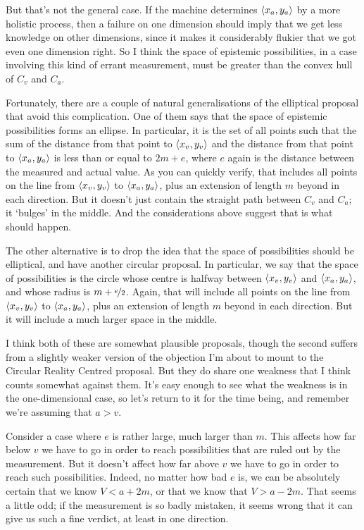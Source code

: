 But that's not the general case. If the machine determines $\langle x_a, y_a \rangle$ by a more holistic process, then a failure on one dimension should imply that we get less knowledge on other dimensions, since it makes it considerably flukier that we got even one dimension right. So I think the space of epistemic possibilities, in a case involving this kind of errant measurement, must be greater than the convex hull of $C_v$ and $C_a$.

Fortunately, there are a couple of natural generalisations of the elliptical proposal that avoid this complication. One of them says that the space of epistemic possibilities forms an ellipse. In particular, it is the set of all points such that the sum of the distance from that point to $\langle x_v, y_v \rangle$ and the distance from that point to $\langle x_a, y_a \rangle$ is less than or equal to $2m + e$, where $e$ again is the distance between the measured and actual value. As you can quickly verify, that includes all points on the line from $\langle x_v, y_v \rangle$ to $\langle x_a, y_a \rangle$, plus an extension of length $m$ beyond in each direction. But it doesn't just contain the straight path between $C_v$ and $C_a$; it `bulges' in the middle. And the considerations above suggest that is what should happen.

The other alternative is to drop the idea that the space of possibilities should be elliptical, and have another circular proposal. In particular, we say that the space of possibilities is the circle whose centre is halfway between $\langle x_v, y_v \rangle$ and $\langle x_a, y_a \rangle$, and whose radius is $m + \nicefrac{e}{2}$. Again, that will include all points on the line from $\langle x_v, y_v \rangle$ to $\langle x_a, y_a \rangle$, plus an extension of length $m$ beyond in each direction. But it will include a much larger space in the middle.

I think both of these are somewhat plausible proposals, though the second suffers from a slightly weaker version of the objection I'm about to mount to the Circular Reality Centred proposal. But they do share one weakness that I think counts somewhat against them. It's easy enough to see what the weakness is in the one-dimensional case, so let's return to it for the time being, and remember we're assuming that $a > v$.

Consider a case where $e$ is rather large, much larger than $m$. This affects how far below $v$ we have to go in order to reach possibilities that are ruled out by the measurement. But it doesn't affect how far above $v$ we have to go in order to reach such possibilities. Indeed, no matter how bad $e$ is, we can be absolutely certain that we know $V < a + 2m$, or that we know that $V > a - 2m$. That seems a little odd; if the measurement is so badly mistaken, it seems wrong that it can give us such a fine verdict, at least in one direction.

